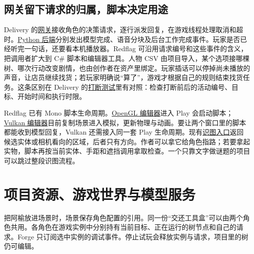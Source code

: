 \documentclass[UTF8,11pt,fontset=fandol,a4paper]{ctexart}
\newcommand{\pg}[1]{\clearpage\section{#1}}
\newcommand{\src}[2]{\href{#1}{#2}}
\begin{document}
\subsection*{网关留下请求的归属，脚本决定用途}

Delivery 的\src{run:D:/Udev/Delivery/Source/Delivery/AI/Network/DeliveryAiGatewaySubsystem.cpp}{网关}接收角色的决策请求，逐行派发回复，在游戏线程处理取消和超时。\src{run:D:/Udev/Delivery/Tools/DeliveryAI/streaming.py}{Python 后端}分别发出模型完成、语音分块及后台工作完成事件。玩家是否已经听完一句话，还要看本机播放器。Redflag 可沿用请求编号和这些事件的含义，把调用者扩大到 C\# 脚本和编辑器工具。人物 CSV 由项目导入，某个选项接哪棵树、哪次行动改变剧情，也由创作者在资产里绑定。玩家插话可以停掉尚未播放的声音，让店员继续找货；若玩家明确说“算了”，游戏才根据自己的规则结束找货任务。这条区别在 Delivery 的\src{run:D:/Udev/Delivery/Source/Delivery/AI/Tests/Conversation/DeliveryNpcPlayerInterruptionTests.cpp}{打断测试}里有对照：检查打断前后的活动编号、目标、开始时间和执行时限。

Redflag 已有 Mono 脚本生命周期。\src{run:D:/Cdev/Redflag/RedflagForge/src/ForgeLayer.cpp}{OpenGL 编辑器}进入 Play 会启动脚本；\src{run:D:/Cdev/Redflag/RedflagForge/src/VulkanForgeLayer.cpp}{Vulkan 编辑器}目前复制场景进入模拟，更新物理与动画。要让两个窗口里的脚本都能收到模型回复，Vulkan 还需接入同一套 Play 生命周期。现有\src{run:D:/Cdev/Redflag/Redflag/src/Redflag/Scene/NpcVision.h}{识图入口}返回候选实体或相机看向的区域，后者只有方向。作者可以拿它给角色指路；若要拿起实物，脚本再按当前实体、手距和遮挡调用拿取检查。一个只靠文字做谜题的项目可以跳过整段识图流程。

\pg{项目资源、游戏世界与模型服务}
把阿榆放进场景时，场景保存角色配置的引用。同一份“交还工具盒”可以由两个角色共用。各角色在游戏实例中分别持有当前目标、正在运行的树节点和自己的请求。Forge 只订阅选中实例的调试事件。停止试玩会释放实例与请求，项目里的树仍可编辑。
\end{document}
